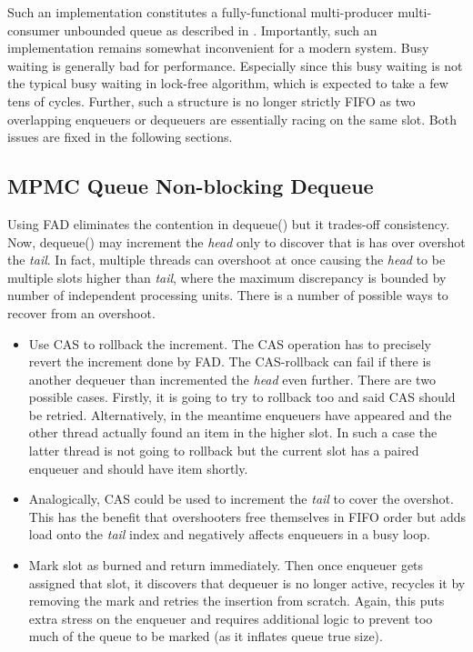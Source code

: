 \documentclass[12pt,a4paper,twoside]{report}
\begin{document}
Such an implementation constitutes a fully-functional multi-producer multi-consumer unbounded queue as described in \cite{Kappes2021}. Importantly, such an implementation remains somewhat inconvenient for a modern system. Busy waiting is generally bad for performance. Especially since this busy waiting is not the typical busy waiting in lock-free algorithm, which is expected to take a few tens of cycles. Further, such a structure is no longer strictly FIFO as two overlapping enqueuers or dequeuers are essentially racing on the same slot. Both issues are fixed in the following sections. 

\subsection{MPMC Queue Non-blocking Dequeue}
\label{section:mpmc_non_blocking_dequeue}

Using FAD eliminates the contention in dequeue() but it trades-off consistency. Now, dequeue() may increment the \textit{head} only to discover that is has over overshot the \textit{tail}. In fact, multiple threads can overshoot at once causing the \textit{head} to be multiple slots higher than \textit{tail}, where the maximum discrepancy is bounded by number of independent processing units. There is a number of possible ways to recover from an overshoot.

\begin{itemize}
    \item Use CAS to rollback the increment. The CAS operation has to precisely revert the increment done by FAD. The CAS-rollback can fail if there is another dequeuer than incremented the \textit{head} even further. There are two possible cases. Firstly, it is going to try to rollback too and said CAS should be retried. Alternatively, in the meantime enqueuers have appeared and the other thread actually found an item in the higher slot. In such a case the latter thread is not going to rollback but the current slot has a paired enqueuer and should have item shortly. 
    \item Analogically, CAS could be used to increment the \textit{tail} to cover the overshot. This has the benefit that overshooters free themselves in FIFO order but adds load onto the \textit{tail} index and negatively affects enqueuers in a busy loop.
    \item Mark slot as burned and return immediately. Then once enqueuer gets assigned that slot, it discovers that dequeuer is no longer active, recycles it by removing the mark and retries the insertion from scratch. Again, this puts extra stress on the enqueuer and requires additional logic to prevent too much of the queue to be marked (as it inflates queue true size).  
\end{itemize}
\end{document}
